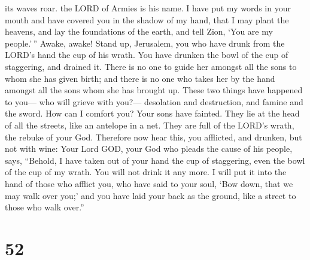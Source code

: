 its waves roar. the LORD of Armies is his name.  I have
put my words in your mouth and have covered you in the shadow of my
hand, that I may plant the heavens, and lay the foundations of the
earth, and tell Zion, `You are my people.'\,''  Awake,
awake! Stand up, Jerusalem, you who have drunk from the LORD's hand the
cup of his wrath. You have drunken the bowl of the cup of staggering,
and drained it.  There is no one to guide her amongst all
the sons to whom she has given birth; and there is no one who takes her
by the hand amongst all the sons whom she has brought up.
 These two things have happened to you--- who will grieve
with you?--- desolation and destruction, and famine and the sword. How
can I comfort you?  Your sons have fainted. They lie at
the head of all the streets, like an antelope in a net. They are full of
the LORD's wrath, the rebuke of your God.  Therefore now
hear this, you afflicted, and drunken, but not with wine:
 Your Lord GOD, your God who pleads the cause of his
people, says, ``Behold, I have taken out of your hand the cup of
staggering, even the bowl of the cup of my wrath. You will not drink it
any more.  I will put it into the hand of those who
afflict you, who have said to your soul, `Bow down, that we may walk
over you;' and you have laid your back as the ground, like a street to
those who walk over.''

\hypertarget{section-49}{%
\section{52}\label{section-49}}

